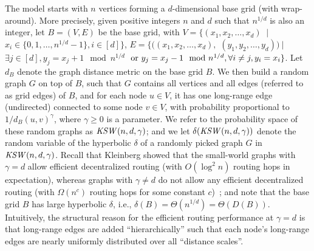 \documentclass[11pt]{article}
\def\KSW{{\it KSW }}
\begin{document}
The model starts with $n$ vertices forming a $d$-dimensional base grid 
(with wrap-around).  %
More precisely, given positive integers $n$ and $d$ such that $n^{1/d}$ is also an integer, 
	let $B=(V,E)$ be the base grid, with
	$V=\{(x_1,x_2,\ldots,x_d) $ $\ |\ $ 
	$x_i \in \{0,1,\ldots, n^{1/d}-1\}, i\in [d]\}$,
        $E = \{((x_1,x_2,\ldots,x_d),$ $ (y_1,y_2,\ldots,y_d))\ |\ $ 
	$\exists j\in [d], y_j = x_j+1 \mod n^{1/d} $ ${\rm\ or\ } y_j = x_j-1 \mod n^{1/d},
	\forall i\ne j, y_i=x_i\}$.
Let $d_B$ denote the graph distance metric on the base grid $B$.
We then build a random graph $G$ on top of $B$, such that
	$G$ contains all vertices and all edges (referred to as grid edges)
	of $B$, and for each node $u\in V$, 
	it has one long-range edge (undirected)
	connected to some node $v\in V$, with probability proportional
	to $1/d_B(u,v)^\gamma$, where $\gamma\ge 0$ is a parameter.
We refer to the probability space of these random graphs as
	$\KSW(n, d, \gamma)$; and
we let $\delta(\KSW(n, d, \gamma))$ denote the random variable of
	the hyperbolic $\delta$ of a randomly picked graph $G$ in 
	$\KSW(n, d, \gamma)$.
Recall that Kleinberg showed that the small-world graphs with $\gamma=d$ 
allow efficient decentralized routing (with $O(\log^2 n)$ routing hops in 
expectation), whereas graphs with $\gamma \ne d$ do not allow any efficient 
decentralized routing (with $\Omega(n^c)$ routing hops for some constant 
$c$)~\cite{Kle00}; and 
note that the base grid $B$ has large hyperbolic $\delta$, i.e., 
$\delta(B) = \Theta(n^{1/d}) = \Theta(D(B))$.
Intuitively, the structural reason for the efficient routing performance
	at $\gamma=d$ is that long-range edges are added ``hierarchically'' 	
	such that each node's 
	long-range edges are nearly uniformly distributed over all ``distance 
	scales''.


\end{document}
